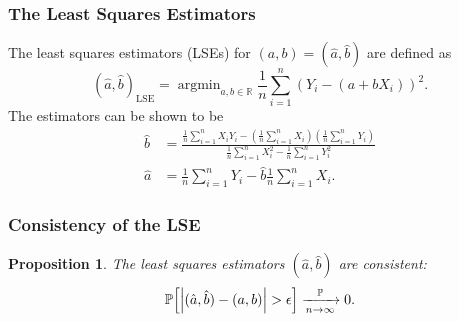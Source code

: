 \documentclass[letterpaper, reqno]{amsart}
\newtheorem{prop}{Proposition}[section]
\numberwithin{equation}{section}
\newcommand{\ddfrac}[2]{\frac{\displaystyle #1}{\displaystyle #2}}
\newcommand{\Prob}[1]{\mathbb{P}\mleft[#1\mright]}
\newcommand{\R}{\mathbb{R}}  %
\newcommand{\sumi}[2]{\sum_{#1=1}^{#2}}
\newcommand{\avg}[2]{\frac{1}{#2}\sumi{#1}{#2}}
\newcommand{\Plim}{\xrightarrow[n \to \infty]{\mathbb{P}}}
\DeclareMathOperator*{\argmin}{argmin}
\begin{document}
\subsubsection{The Least Squares Estimators}
The least squares estimators (LSEs) for $(a, b) = (\hat{a}, \hat{b})$ are defined as 
\[ (\hat{a}, \hat{b})_\mathrm{LSE} = \argmin_{a, b \in \R} \avg{i}{n}{(Y_i - (a + bX_i))^2}. \]
The estimators can be shown to be
\begin{align*}
  \hat{b} &= \ddfrac{\avg{i}{n}{X_iY_i} - \left(\avg{i}{n}{X_i}\right)\left(\avg{i}{n}{Y_i}\right)}
                    {\avg{i}{n}{X_i^2} - \avg{i}{n}{Y_i^2}} \\
  \hat{a} &= \avg{i}{n}{Y_i} - \hat{b}\avg{i}{n}{X_i}.
\end{align*}

\subsubsection{Consistency of the LSE}
\begin{prop}
  The least squares estimators $(\hat{a}, \hat{b})$ are consistent:
  \[  \Prob{\left|(\hat{a}, \hat{b}) - (a, b)\right| > \epsilon} \Plim 0. \]
\end{prop}
\end{document}

